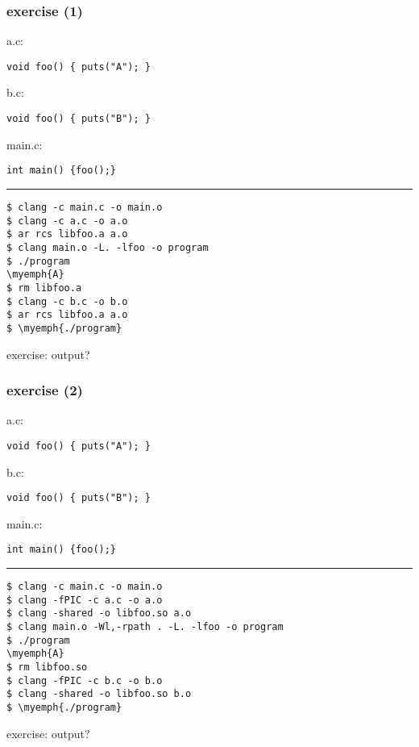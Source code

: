 \begin{frame}[fragile]\frametitle{exercise (1)}
\begin{minipage}{0.45\textwidth}
a.c:
\begin{Verbatim}[fontsize=\small]
void foo() { puts("A"); }
\end{Verbatim}
\end{minipage}
\begin{minipage}{0.45\textwidth}
b.c:
\begin{Verbatim}[fontsize=\small]
void foo() { puts("B"); }
\end{Verbatim}
\end{minipage}
main.c:
\begin{Verbatim}[fontsize=\small]
int main() {foo();}
\end{Verbatim}
\hrule
\begin{Verbatim}[fontsize=\small,commandchars=\\\{\}]
$ clang -c main.c -o main.o
$ clang -c a.c -o a.o
$ ar rcs libfoo.a a.o
$ clang main.o -L. -lfoo -o program
$ ./program
\myemph{A}
$ rm libfoo.a
$ clang -c b.c -o b.o
$ ar rcs libfoo.a a.o
$ \myemph{./program}
\end{Verbatim}
exercise: output?
\end{frame}

\begin{frame}[fragile]\frametitle{exercise (2)}
\begin{minipage}{0.45\textwidth}
a.c:
\begin{Verbatim}[fontsize=\small]
void foo() { puts("A"); }
\end{Verbatim}
\end{minipage}
\begin{minipage}{0.45\textwidth}
b.c:
\begin{Verbatim}[fontsize=\small]
void foo() { puts("B"); }
\end{Verbatim}
\end{minipage}
main.c:
\begin{Verbatim}[fontsize=\small]
int main() {foo();}
\end{Verbatim}
\hrule
\begin{Verbatim}[fontsize=\small,commandchars=\\\{\}]
$ clang -c main.c -o main.o
$ clang -fPIC -c a.c -o a.o
$ clang -shared -o libfoo.so a.o
$ clang main.o -Wl,-rpath . -L. -lfoo -o program
$ ./program
\myemph{A}
$ rm libfoo.so
$ clang -fPIC -c b.c -o b.o
$ clang -shared -o libfoo.so b.o
$ \myemph{./program}
\end{Verbatim}
exercise: output?
\end{frame}

